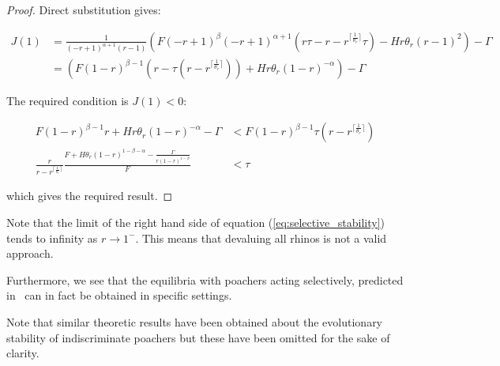\documentclass[10pt]{article}
\begin{document}
\begin{proof}
Direct substitution gives:

\begin{equation*}
    \begin{split}
    J(1) &= \frac{1}{\left(- r + 1\right)^{\alpha + 1} \left(r - 1\right)}
                \left(
                    F \left(- r + 1\right)^{\beta}
                    \left(- r + 1\right)^{\alpha + 1}
                    \left(
                        r \tau -
                        r -
                        r^{\lceil{\frac{1}{\theta_{r}}}\rceil} \tau
                    \right)
                    - H r
                    \theta_{r}
                    \left(r - 1\right)^{2}
                \right) - \Gamma\\
		&= \left(F
                 \left(1 - r\right)^{\beta - 1}
                 \left(
                     r -
                     \tau(r - r^{\lceil{\frac{1}{\theta_{r}}}\rceil} )
                 \right) +
                 H r \theta_{r} \left(1 - r\right)^{-\alpha}
           \right)
           - \Gamma
        \end{split}
    \end{equation*}

The required condition is \(J(1)<0\):

\begin{equation*}
    \begin{split}
    F
    \left(1 - r\right)^{\beta - 1}r +
    H r \theta_{r}
    \left(1 - r\right)^{-\alpha}
    - \Gamma
            & < F \left(1 - r\right)^{\beta - 1}
    \tau(r - r^{\lceil{\frac{1}{\theta_{r}}}\rceil} )\\
    \frac{r}{r - r^{\lceil{\frac{1}{\theta_{r}}}\rceil}}
    \frac{F + H \theta_{r} \left(1 - r\right)^{1-\beta-\alpha} -
    \frac{\Gamma}{r(1-r)^{1-\beta}}}{F} & < \tau
\end{split}
\end{equation*}

which gives the required result.
\end{proof}

Note that the limit of the right hand side of equation (\ref{eq:selective_stability})
tends to infinity as \(r\to1^-\). This means that devaluing all rhinos is not
a valid approach.

Furthermore, we see that the equilibria with poachers acting selectively,
predicted in~\cite{Lee} can in fact be obtained in specific settings.

Note that similar theoretic results have been obtained about the evolutionary
stability of indiscriminate poachers but these have been omitted for the sake of
clarity.
\end{document}
